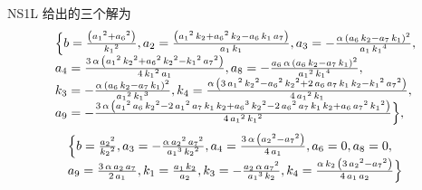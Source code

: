 NS1L 给出的三个解为
\begin{eqnarray}
\renewcommand{\arraystretch}{1.2}
\begin{array}{l}
\dbrace{ 
b=\frac{\left( {{{a}_{1}}}^{2}+{{{a}_{6}}}^{2}\right) }{{{{k}_{1}}}^{2}},
{{a}_{2}}=\frac{\left( {{{a}_{1}}}^{2}\,{{k}_{2}}+{{{a}_{6}}}^{2}\,{{k}_{2}}-{{a}_{6}}\,{{k}_{1}}\,{{a}_{7}}\right) }{{{a}_{1}}\,{{k}_{1}}},
{{a}_{3}}=-\frac{\alpha\,\left( {{a}_{6}}\,{{k}_{2}}-{{a}_{7}}\,{{k}_{1}}\right) ^{2}}{{{a}_{1}}\,{{{k}_{1}}}^{4}},\\
{{a}_{4}}=\frac{3\,\alpha\,\left( {{{a}_{1}}}^{2}\,{{{k}_{2}}}^{2}+{{{a}_{6}}}^{2}\,{{{k}_{2}}}^{2}-{{{k}_{1}}}^{2}\,{{{a}_{7}}}^{2}\right) }{4\,{{{k}_{1}}}^{2}\,{{a}_{1}}},
{{a}_{8}}=-\frac{{{a}_{6}}\,\alpha\,\left( {{a}_{6}}\,{{k}_{2}}-{{a}_{7}}\,{{k}_{1}}\right) ^{2}}{{{{a}_{1}}}^{2}\,{{{k}_{1}}}^{4}},\\
{{k}_{3}}=-\frac{\alpha\,\left( {{a}_{6}}\,{{k}_{2}}-{{a}_{7}}\,{{k}_{1}}\right) ^{2}}{{{{a}_{1}}}^{2}\,{{{k}_{1}}}^{3}},
{{k}_{4}}=\frac{\alpha\,\left( 3\,{{{a}_{1}}}^{2}\,{{{k}_{2}}}^{2}-{{{a}_{6}}}^{2}\,{{{k}_{2}}}^{2}+2\,{{a}_{6}}\,{{a}_{7}}\,{{k}_{1}}\,{{k}_{2}}-{{{k}_{1}}}^{2}\,{{{a}_{7}}}^{2}\right) }{4\,{{{a}_{1}}}^{2}\,{{k}_{1}}},\\
{{a}_{9}}=-\frac{3\,\alpha\,\left( {{{a}_{1}}}^{2}\,{{a}_{6}}\,{{{k}_{2}}}^{2}-2\,{{{a}_{1}}}^{2}\,{{a}_{7}}\,{{k}_{1}}\,{{k}_{2}}+{{{a}_{6}}}^{3}\,{{{k}_{2}}}^{2}-2\,{{{a}_{6}}}^{2}\,{{a}_{7}}\,{{k}_{1}}\,{{k}_{2}}+{{a}_{6}}\,{{{a}_{7}}}^{2}\,{{{k}_{1}}}^{2}\right) }{4\,{{{a}_{1}}}^{2}\,{{{k}_{1}}}^{2}} 
}, 
\end{array} \label{1S1L-1}
\end{eqnarray}
\begin{equation}
\renewcommand{\arraystretch}{1.2}
\begin{array}{l}  
\dbrace{
b=\frac{{{{a}_{2}}}^{2}}{{{{k}_{2}}}^{2}},
{{a}_{3}}=-\frac{\alpha\,{{{a}_{2}}}^{2}\,{{{a}_{7}}}^{2}}{{{{a}_{1}}}^{3}\,{{{k}_{2}}}^{2}},
{{a}_{4}}=\frac{3\,\alpha\,\left( {{{a}_{2}}}^{2}-{{{a}_{7}}}^{2}\right) }{4\,{{a}_{1}}},
{{a}_{6}}=0,
{{a}_{8}}=0,\\
{{a}_{9}}=\frac{3\,\alpha\,{{a}_{2}}\,{{a}_{7}}}{2\,{{a}_{1}}},
{{k}_{1}}=\frac{{{a}_{1}}\,{{k}_{2}}}{{{a}_{2}}},
{{k}_{3}}=-\frac{{{a}_{2}}\,\alpha\,{{{a}_{7}}}^{2}}{{{{a}_{1}}}^{3}\,{{k}_{2}}},
{{k}_{4}}=\frac{\alpha\,{{k}_{2}}\,\left( 3\,{{{a}_{2}}}^{2}-{{{a}_{7}}}^{2}\right) }{4\,{{a}_{1}}\,{{a}_{2}}}
}
\end{array}
\label{1S1L-2}
\end{equation}
